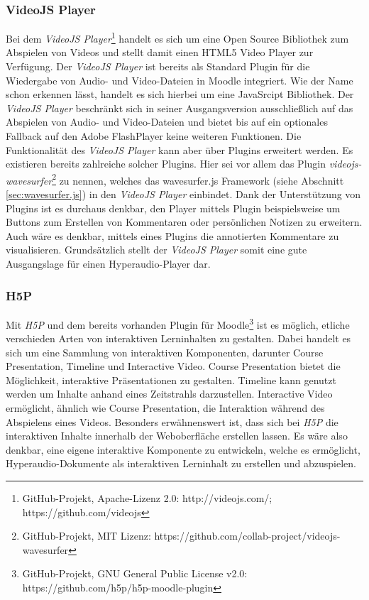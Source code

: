 
\subsubsection{VideoJS Player}
Bei dem \textit{VideoJS Player}\footnote{GitHub-Projekt, Apache-Lizenz 2.0: http://videojs.com/; https://github.com/videojs} handelt es sich um eine Open Source Bibliothek zum Abspielen von Videos und stellt damit einen HTML5 Video Player zur Verfügung. Der \textit{VideoJS Player} ist bereits als Standard Plugin für die Wiedergabe von Audio- und Video-Dateien in Moodle integriert. Wie der Name schon erkennen lässt, handelt es sich hierbei um eine JavaSrcipt Bibliothek. Der \textit{VideoJS Player} beschränkt sich in seiner Ausgangsversion ausschließlich auf das Abspielen von Audio- und Video-Dateien und bietet bis auf ein optionales Fallback auf den Adobe FlashPlayer keine weiteren Funktionen. Die Funktionalität des \textit{VideoJS Player} kann aber über Plugins erweitert werden. Es existieren bereits zahlreiche solcher Plugins. Hier sei vor allem das Plugin \textit{videojs-wavesurfer}\footnote{GitHub-Projekt, MIT Lizenz: https://github.com/collab-project/videojs-wavesurfer} zu nennen, welches das wavesurfer.js Framework (siehe Abschnitt \ref{sec:wavesurfer.js}) in den \textit{VideoJS Player} einbindet. Dank der Unterstützung von Plugins ist es durchaus denkbar, den Player mittels Plugin beispielsweise um Buttons zum Erstellen von Kommentaren oder persönlichen Notizen zu erweitern. Auch wäre es denkbar, mittels eines Plugins die annotierten Kommentare zu visualisieren. Grundsätzlich stellt der \textit{VideoJS Player} somit eine gute Ausgangslage für einen Hyperaudio-Player dar.

\subsubsection{H5P}
Mit \textit{H5P} und dem bereits vorhanden Plugin für Moodle\footnote{GitHub-Projekt, GNU General Public License v2.0: https://github.com/h5p/h5p-moodle-plugin} ist es möglich, etliche verschieden Arten von interaktiven Lerninhalten zu gestalten. Dabei handelt es sich um eine Sammlung von interaktiven Komponenten, darunter Course Presentation, Timeline und Interactive Video. Course Presentation bietet die Möglichkeit, interaktive Präsentationen zu gestalten. Timeline kann genutzt werden um Inhalte anhand eines Zeitstrahls darzustellen. Interactive Video ermöglicht, ähnlich wie Course Presentation, die Interaktion während des Abspielens eines Videos. Besonders erwähnenswert ist, dass sich bei \textit{H5P} die interaktiven Inhalte innerhalb der Weboberfläche erstellen lassen. Es wäre also denkbar, eine eigene interaktive Komponente zu entwickeln, welche es ermöglicht, Hyperaudio-Dokumente als interaktiven Lerninhalt zu erstellen und abzuspielen.

